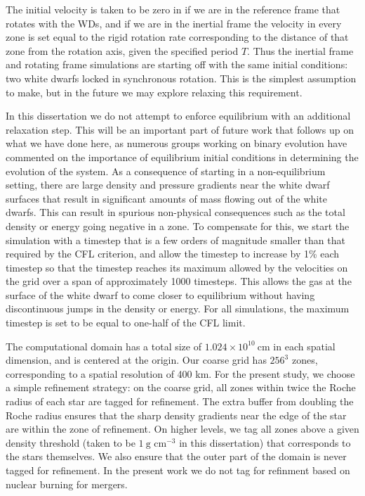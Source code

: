 \documentclass[12pt]{article}
\begin{document}
The initial velocity is taken to be zero in if we are in the reference
frame that rotates with the WDs, and if we are in the inertial frame
the velocity in every zone is set equal to the rigid rotation rate 
corresponding to the distance of that zone from the rotation axis, given
the specified period $T$. Thus the inertial frame and rotating frame 
simulations are starting off with the same initial conditions: two white 
dwarfs locked in synchronous rotation. This is the simplest assumption to 
make, but in the future we may explore relaxing this requirement.

In this dissertation we do not attempt to enforce equilibrium with an additional relaxation
step. This will be an important part of future work that follows up on
what we have done here, as numerous groups working on binary evolution
\citep{swc:2000,motl:2002,rosswog:2004,dan:2011,pakmor:2012:gadget}
have commented on the importance of equilibrium initial conditions in
determining the evolution of the system. As a consequence of starting 
in a non-equilibrium setting, there are 
large density and pressure gradients near the white dwarf surfaces
that result in significant amounts of mass flowing out of the white dwarfs.
This can result in spurious non-physical consequences such as 
the total density or energy going negative in a zone. To compensate 
for this, we start the simulation with a timestep that is a few orders 
of magnitude smaller than that required by the CFL criterion, and allow
the timestep to increase by 1\% each timestep so that the timestep reaches 
its maximum allowed by the velocities on the grid over a span of approximately 
1000 timesteps. This allows the gas at the surface of the white dwarf
to come closer to equilibrium without having 
discontinuous jumps in the density or energy. For all simulations, 
the maximum timestep is set to be equal to one-half of the CFL limit.

The computational domain has a total size of $1.024 \times
10^{10}\ \text{cm}$ in each spatial dimension, and is centered at the
origin. Our coarse grid has $256^3$ zones, corresponding to a spatial
resolution of 400 km. For the present study, we choose a simple
refinement strategy: on the coarse grid, all zones within twice the Roche radius of each
star are tagged for refinement.
The extra buffer from doubling the Roche radius ensures that the sharp density gradients near
the edge of the star are within the zone of refinement. On higher levels, 
we tag all zones above a given density threshold (taken to be $1\ \text{g cm}^{-3}$ 
in this dissertation) that corresponds to the stars themselves. We also ensure
that the outer part of the domain is never tagged for refinement. In
the present work we do not tag for refinment based on nuclear burning for mergers.
\end{document}
